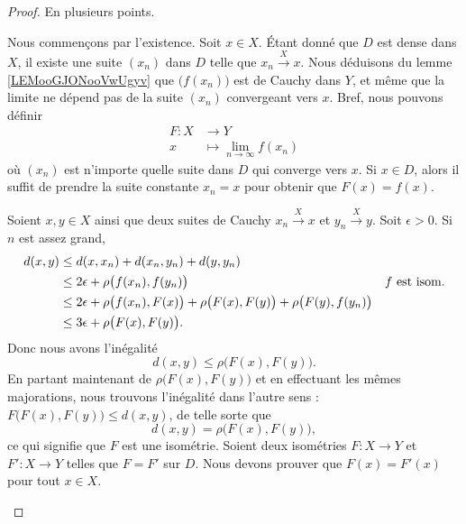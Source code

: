 \begin{proof}
	En plusieurs points.
	\begin{subproof}
		\spitem[Construction de \( F\)]
		Nous commençons par l'existence. Soit \( x\in X\). Étant donné que \( D\) est dense dans \( X\), il existe une suite \( (x_n)\) dans \( D\) telle que \( x_n\stackrel{X}{\longrightarrow}x\). Nous déduisons du lemme \ref{LEMooGJONooVwUgyv} que \( \big( f(x_n) \big)\) est de Cauchy dans \( Y\), et même que la limite ne dépend pas de la suite \( (x_n)\) convergeant vers \( x\). Bref, nous pouvons définir
		\begin{equation}
			\begin{aligned}
				F\colon X & \to Y                             \\
				x         & \mapsto \lim_{n\to \infty} f(x_n)
			\end{aligned}
		\end{equation}
		où \( (x_n)\) est n'importe quelle suite dans \( D\) qui converge vers \( x\). Si \( x\in D\), alors il suffit de prendre la suite constante \( x_n=x \) pour obtenir que \( F(x)=f(x)\).

		Soient \( x,y\in X\) ainsi que deux suites de Cauchy \( x_n\stackrel{X}{\longrightarrow}x\) et \( y_n\stackrel{X}{\longrightarrow}y\). Soit \( \epsilon>0\). Si \( n\) est assez grand,
		\begin{subequations}
			\begin{align}
				d(x,y) & \leq d(x,x_n)+d(x_n,y_n)+d(y,y_n)                                                                                           \\
				       & \leq 2\epsilon+\rho\big( f(x_n),f(y_n) \big)                                                      & \text{\( f\) est isom.} \\
				       & \leq 2\epsilon+\rho\big( f(x_n),F(x) \big)+\rho\big( F(x), F(y) \big)+\rho\big( F(y),f(y_n) \big)                           \\
				       & \leq 3\epsilon+\rho\big( F(x),F(y) \big).
			\end{align}
		\end{subequations}
		Donc nous avons l'inégalité
		\begin{equation}
			d(x,y)\leq \rho\big( F(x),F(y) \big).
		\end{equation}
		En partant maintenant de \( \rho\big( F(x),F(y) \big)\) et en effectuant les mêmes majorations, nous trouvons l'inégalité dans l'autre sens : \( F\big( F(x),F(y) \big)\leq d(x,y)\), de telle sorte que
		\begin{equation}
			d(x,y)= \rho\big( F(x),F(y) \big),
		\end{equation}
		ce qui signifie que \( F\) est une isométrie.
		\spitem[Unicité]
		Soient deux isométries \( F\colon X\to Y\) et \( F'\colon X\to Y\) telles que \( F=F'\) sur \( D\). Nous devons prouver que \( F(x)=F'(x)\) pour tout \( x\in X\).


\end{subproof}
\end{proof}
